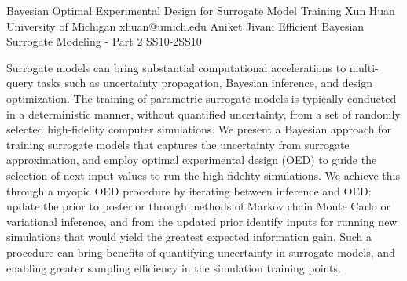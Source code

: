 \begin{talk}
   {Bayesian Optimal Experimental Design for Surrogate Model Training}%
  {Xun Huan}%
  {University of Michigan}%
  {xhuan@umich.edu}%
  {Aniket Jivani}%
{Efficient Bayesian Surrogate Modeling - Part 2}
{}{SS10-2}{SS10}

			
Surrogate models can bring substantial computational accelerations to multi-query tasks such as uncertainty propagation, Bayesian inference, and design optimization. The training of parametric surrogate models is typically conducted in a deterministic manner, without quantified uncertainty, from a set of randomly selected high-fidelity computer simulations. 
We present a Bayesian approach for training surrogate models that captures the uncertainty from surrogate approximation, and employ optimal experimental design (OED) to guide the selection of next input values to run the high-fidelity simulations. We achieve this through a myopic OED procedure by iterating between inference and OED: update the prior to posterior through methods of Markov chain Monte Carlo or variational inference, and from the updated prior identify inputs for running new simulations that would yield the greatest expected information gain. Such a procedure can bring benefits of quantifying uncertainty in surrogate models, and enabling greater sampling efficiency in the simulation training points. 


\medskip


\end{talk}

